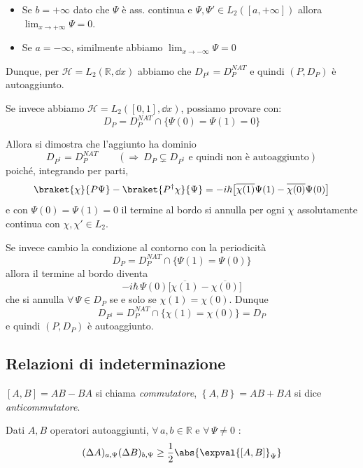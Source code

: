 \begin{itemize}
    \item Se \(b = +\infty\) dato che \(\Psi\) è ass. continua e \(\Psi, \Psi' \in L_2([a, +\infty])\) allora \(\lim_{x\to +\infty} \Psi= 0\).
    \item Se \(a = -\infty\), similmente abbiamo \(\lim_{x \to - \infty} \Psi=0\)
\end{itemize}
Dunque, per \(\mathcal{H}= L_2(\mathbb{R}, \dd{x})\) abbiamo che \(D_{P^\dagger}= D_{P}^{NAT}\) e quindi \((P, D_P)\) è autoaggiunto.

Se invece abbiamo \(\mathcal{H} = L_2([0,1], \dd{x})\), possiamo provare con:
\[
    D_P = D_P^{NAT} \cap \big\{ \Psi(0)=\Psi(1)=0 \big\}
\]

Allora si dimostra che l'aggiunto ha dominio
\[
    D_{P^\dagger}= D_P^{NAT} \qquad (\Rightarrow \ D_P \subsetneq D_{P^\dagger} \text{ e quindi non è autoaggiunto})
\]
poiché, integrando per parti,
\[
    \braket{\chi}{P\Psi}-\braket{P^\dagger\chi}{\Psi}
    = -i\hbar\big[\overline{\chi(1)}\Psi(1)-\overline{\chi(0)}\Psi(0)\big]
\]
e con \(\Psi(0)=\Psi(1)=0\) il termine al bordo si annulla per ogni \(\chi\) assolutamente continua con \(\chi,\chi'\in L_2\).

Se invece cambio la condizione al contorno con la periodicità
\[
    D_P = D_P^{NAT} \cap \big\{ \Psi(1)=\Psi(0) \big\}
\]
allora il termine al bordo diventa
\[
    -i\hbar\,\Psi(0)\big[\overline{\chi(1)}-\overline{\chi(0)}\big]
\]
che si annulla \(\forall\,\Psi\in D_P\) se e solo se \(\chi(1)=\chi(0)\). Dunque
\[
    D_{P^\dagger}= D_P^{NAT} \cap \big\{ \chi(1)=\chi(0) \big\}= D_P
\]
e quindi \((P,D_P)\) è autoaggiunto.



\subsection{Relazioni di indeterminazione}

\begin{definition}
    \([A,B]= AB-BA \) si chiama \textit{commutatore}, \(\left\{ A, B \right\} = AB+BA \) si dice \textit{anticommutatore}.
\end{definition}
\begin{theorem}
    Dati \(A, B\) operatori autoaggiunti, \(\forall \, a,b \in \mathbb{ R}\) e \(\forall\, \Psi\neq 0 \) :
    \begin{equation}
        (\Delta A )_{a,\Psi} (\Delta B )_{b, \Psi}\geq \frac{1}{2}\abs{\expval{[A,B]}_\Psi}
    \end{equation}
\end{theorem}

